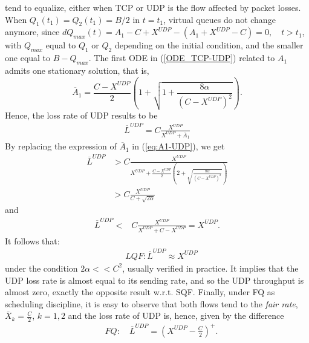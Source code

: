 \documentclass[a4paper,oneside, 11pt]{article}
\begin{document}
tend to equalize, either when TCP or UDP is the flow affected by packet losses. When $Q_1(t_1)=Q_2(t_1)=B/2$ in $t=t_1$, virtual queues do not change anymore, since
$dQ_{max}(t)=A_1-C+X^{UDP}-(A_1+X^{UDP}-C)=0, \quad t>t_1$, with $Q_{max}$ equal to $Q_1$ or $Q_2$ depending on the initial condition, and the
smaller one equal to $B-Q_{max}$.
The first ODE in (\ref{ODE_TCP-UDP}) related to $A_1$ admits one stationary solution, that is,
$$\label{eq:A1-UDP}
\overline{A}_1=\frac{C-X^{UDP}}{2}\left( 1+\sqrt{1+\frac{8\alpha}{(C-X^{UDP})^2}}\right).$$
Hence, the loss rate of UDP results to be \begin{align}\label{Loss_rate_UDP_LQF-prem}
\overline{L}^{UDP}=C\frac{X^{UDP}}{X^{UDP}+\overline{A}_1}
\end{align}By replacing the expression of $\overline{A}_1$ in (\ref{eq:A1-UDP}), we get
\begin{align*}\overline{L}^{UDP}&>C\frac{X^{UDP}}{X^{UDP}+\frac{C-X^{UDP}}{2}\left(2+\sqrt{\frac{8\alpha}{(C-X^{UDP})^2}}\right)} \nonumber \\&>C\frac{X^{UDP}}{C+\sqrt{2\alpha}}
\end{align*}
and 
\begin{align*}\overline{L}^{UDP}<&C\frac{X^{UDP}}{X^{UDP}+C-X^{UDP}} =X^{UDP}.
\end{align*}
It follows that:
\begin{align}\label{Loss_rate_UDP_LQF}
\quad LQF: \overline{L}^{UDP}\approx X^{UDP}
\end{align}under the condition $2\alpha<<C^2$, usually verified in practice.
It implies that the UDP loss rate is almost equal to its sending rate, and so the UDP throughput
is almost zero, exactly the opposite result w.r.t. SQF.
Finally, under FQ as scheduling discipline, it is easy to observe that both flows tend to the \textit{fair rate},
$\overline{X}_k=\frac{C}{2}$, $k=1,2$
and the loss rate of UDP is, hence, given by the difference\begin{align}\label{Loss_rate_UDP_FQ}
\quad FQ: \quad\overline{L}^{UDP}=\left(X^{UDP}-\frac{C}{2}\right)^+.
\end{align}
\end{document}
